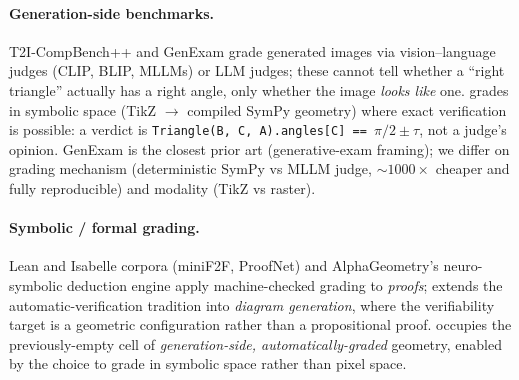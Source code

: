 \paragraph{Generation-side benchmarks.}
T2I-CompBench++ \citep{huang2025t2icompbenchpp} and GenExam \citep{wang2025genexam} grade generated images via vision--language judges (CLIP, BLIP, MLLMs) or LLM judges; these cannot tell whether a ``right triangle'' actually has a right angle, only whether the image \emph{looks like} one.
\GeoGenBench grades in symbolic space (TikZ $\to$ compiled SymPy geometry) where exact verification is possible: a  verdict is \texttt{Triangle(B, C, A).angles[C] == $\pi/2 \pm \tau$}, not a judge's opinion.
GenExam is the closest prior art (generative-exam framing); we differ on grading mechanism (deterministic SymPy vs MLLM judge, $\sim$$1000\times$ cheaper and fully reproducible) and modality (TikZ vs raster).

\paragraph{Symbolic / formal grading.}
Lean and Isabelle corpora (miniF2F, ProofNet) and AlphaGeometry's neuro-symbolic deduction engine \citep{trinh2024alphageometry} apply machine-checked grading to \emph{proofs}; \GeoGenBench extends the automatic-verification tradition into \emph{diagram generation}, where the verifiability target is a geometric configuration rather than a propositional proof.
\GeoGenBench occupies the previously-empty cell of \emph{generation-side, automatically-graded} geometry, enabled by the choice to grade in symbolic space rather than pixel space.
